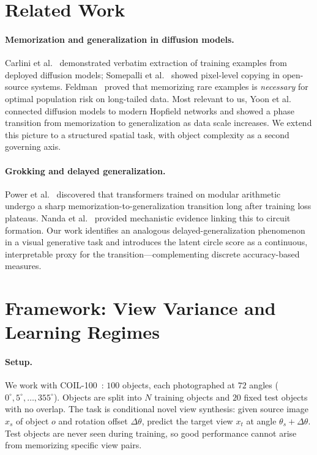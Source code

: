 \documentclass[11pt]{article}
\newcommand{\Dtheta}{\Delta\theta}
\begin{document}
\section{Related Work}
\label{sec:related}

\paragraph{Memorization and generalization in diffusion models.}
Carlini et al.~\cite{carlini2023extracting} demonstrated verbatim extraction of
training examples from deployed diffusion models; Somepalli et
al.~\cite{somepalli2023diffusion} showed pixel-level copying in open-source
systems.  Feldman~\cite{feldman2020memo} proved that memorizing rare examples
is \emph{necessary} for optimal population risk on long-tailed data.  Most
relevant to us, Yoon et al.~\cite{yoon2025memorization} connected diffusion
models to modern Hopfield networks and showed a phase transition from
memorization to generalization as data scale increases.  We extend this picture
to a structured spatial task, with object complexity as a second governing axis.

\paragraph{Grokking and delayed generalization.}
Power et al.~\cite{power2022grokking} discovered that transformers trained on
modular arithmetic undergo a sharp memorization-to-generalization transition
long after training loss plateaus.  Nanda et al.~\cite{nanda2023progress}
provided mechanistic evidence linking this to circuit formation.  Our work
identifies an analogous delayed-generalization phenomenon in a visual generative
task and introduces the latent circle score as a continuous, interpretable proxy
for the transition---complementing discrete accuracy-based measures.

\section{Framework: View Variance and Learning Regimes}
\label{sec:framework}

\paragraph{Setup.}
We work with COIL-100~\cite{nene1996coil}: $100$ objects, each photographed at
$72$ angles ($0^{\circ}, 5^{\circ}, \ldots, 355^{\circ}$).  Objects are split
into $N$ training objects and $20$ fixed test objects with no overlap.  The
task is conditional novel view synthesis: given source image $x_s$ of object
$o$ and rotation offset $\Dtheta$, predict the target view $x_t$ at angle
$\theta_s + \Dtheta$.  Test objects are never seen during training, so
good performance cannot arise from memorizing specific view pairs.
\end{document}
